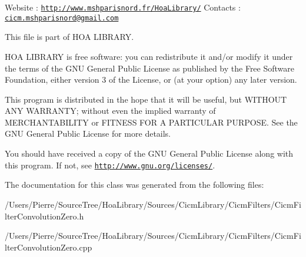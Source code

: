 Website \-: \href{http://www.mshparisnord.fr/HoaLibrary/}{\tt http\-://www.\-mshparisnord.\-fr/\-Hoa\-Library/} Contacts \-: \href{mailto:cicm.mshparisnord@gmail.com}{\tt cicm.\-mshparisnord@gmail.\-com}

This file is part of H\-O\-A L\-I\-B\-R\-A\-R\-Y.

H\-O\-A L\-I\-B\-R\-A\-R\-Y is free software\-: you can redistribute it and/or modify it under the terms of the G\-N\-U General Public License as published by the Free Software Foundation, either version 3 of the License, or (at your option) any later version.

This program is distributed in the hope that it will be useful, but W\-I\-T\-H\-O\-U\-T A\-N\-Y W\-A\-R\-R\-A\-N\-T\-Y; without even the implied warranty of M\-E\-R\-C\-H\-A\-N\-T\-A\-B\-I\-L\-I\-T\-Y or F\-I\-T\-N\-E\-S\-S F\-O\-R A P\-A\-R\-T\-I\-C\-U\-L\-A\-R P\-U\-R\-P\-O\-S\-E. See the G\-N\-U General Public License for more details.

You should have received a copy of the G\-N\-U General Public License along with this program. If not, see \href{http://www.gnu.org/licenses/}{\tt http\-://www.\-gnu.\-org/licenses/}. 

The documentation for this class was generated from the following files\-:\begin{DoxyCompactItemize}
\item 
/\-Users/\-Pierre/\-Source\-Tree/\-Hoa\-Library/\-Sources/\-Cicm\-Library/\-Cicm\-Filters/Cicm\-Filter\-Convolution\-Zero.\-h\item 
/\-Users/\-Pierre/\-Source\-Tree/\-Hoa\-Library/\-Sources/\-Cicm\-Library/\-Cicm\-Filters/Cicm\-Filter\-Convolution\-Zero.\-cpp\end{DoxyCompactItemize}
